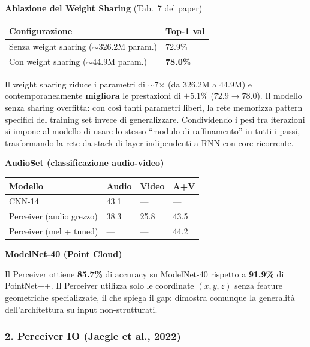 \documentclass[
  11pt,
]{article}
\begin{document}
\textbf{Ablazione del Weight Sharing} (Tab.\ 7 del paper)

{\small
\begin{longtable}{@{}p{7cm} p{2.5cm}@{}}
\toprule
\textbf{Configurazione} & \textbf{Top-1 val} \\
\midrule
\endhead
Senza weight sharing ($\sim$326.2M param.) & 72.9\% \\[2pt]
Con weight sharing ($\sim$44.9M param.) & \textbf{78.0\%} \\
\bottomrule
\end{longtable}
}

\begin{notabox}[title={\textbf{Weight sharing come regolarizzatore}}]
Il weight sharing riduce i parametri di $\sim$7$\times$ (da $326.2$M a $44.9$M) e contemporaneamente \textbf{migliora} le prestazioni di $+5.1\%$ ($72.9 \to 78.0$). Il modello senza sharing overfitta: con così tanti parametri liberi, la rete memorizza pattern specifici del training set invece di generalizzare. Condividendo i pesi tra iterazioni si impone al modello di usare lo stesso ``modulo di raffinamento'' in tutti i passi, trasformando la rete da stack di layer indipendenti a RNN con core ricorrente.
\end{notabox}

\textbf{AudioSet (classificazione audio-video)}

{\small
\begin{longtable}{@{}p{4.5cm} p{2.2cm} p{2.2cm} p{2.2cm}@{}}
\toprule
\textbf{Modello} & \textbf{Audio} & \textbf{Video} & \textbf{A+V} \\
\midrule
\endhead
CNN-14 & 43.1 & --- & --- \\[2pt]
Perceiver (audio grezzo) & 38.3 & 25.8 & 43.5 \\[2pt]
Perceiver (mel + tuned) & --- & --- & 44.2 \\
\bottomrule
\end{longtable}
}

\textbf{ModelNet-40 (Point Cloud)}

Il Perceiver ottiene \textbf{85.7\%} di accuracy su ModelNet-40 rispetto a \textbf{91.9\%} di PointNet++. Il Perceiver utilizza solo le coordinate $(x,y,z)$ senza feature geometriche specializzate, il che spiega il gap: dimostra comunque la generalità dell'architettura su input non-strutturati.

\subsubsection*{2. Perceiver IO (Jaegle et al., 2022)}
\end{document}
